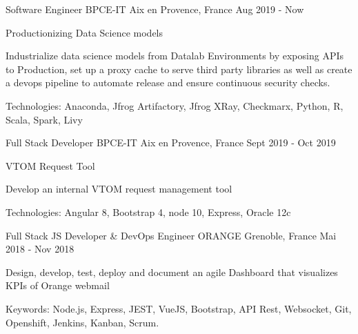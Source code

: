 \begin{cventries}
  \cventry
    {Software Engineer} %
    {BPCE-IT} %
    {Aix en Provence, France} %
    {Aug 2019 - Now} %
    {
      \begin{cvitems} %
       \item {Productionizing Data Science models  }
       \item {Industrialize data science models from Datalab Environments by exposing APIs to Production, set up a proxy cache to serve third party libraries as well as create a devops pipeline to automate release and ensure continuous security checks.}
         \item {Technologies: Anaconda, Jfrog Artifactory, Jfrog XRay, Checkmarx, Python, R, Scala, Spark, Livy}
      \end{cvitems}
    }
  \cventry
    {Full Stack Developer} %
    {BPCE-IT} %
    {Aix en Provence, France} %
    {Sept 2019 - Oct 2019} %
    {
      \begin{cvitems} %
       \item {VTOM Request Tool  }
       \item {Develop an internal VTOM request management tool}
        \item {Technologies: Angular 8, Bootstrap 4, node 10, Express, Oracle 12c}
      \end{cvitems}
    }
  \cventry
    {Full Stack JS Developer \& DevOps Engineer} %
    {ORANGE} %
    {Grenoble, France} %
    {Mai 2018 - Nov 2018} %
    {
      \begin{cvitems} %
        \item {Design, develop, test, deploy and document an agile Dashboard that visualizes KPIs of Orange webmail}
        \item {Keywords: Node.js, Express, JEST, VueJS, Bootstrap, API Rest, Websocket, Git, Openshift, Jenkins, Kanban, Scrum.}
      \end{cvitems}
    }

\end{cventries}
